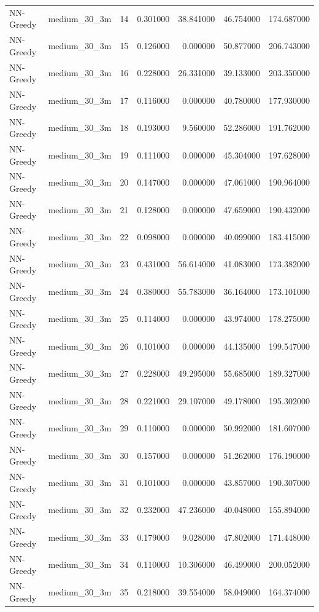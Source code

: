 \begin{tabular}{llrrrrr}
NN-Greedy & medium_30_3m & 14 & 0.301000 & 38.841000 & 46.754000 & 174.687000 \\
NN-Greedy & medium_30_3m & 15 & 0.126000 & 0.000000 & 50.877000 & 206.743000 \\
NN-Greedy & medium_30_3m & 16 & 0.228000 & 26.331000 & 39.133000 & 203.350000 \\
NN-Greedy & medium_30_3m & 17 & 0.116000 & 0.000000 & 40.780000 & 177.930000 \\
NN-Greedy & medium_30_3m & 18 & 0.193000 & 9.560000 & 52.286000 & 191.762000 \\
NN-Greedy & medium_30_3m & 19 & 0.111000 & 0.000000 & 45.304000 & 197.628000 \\
NN-Greedy & medium_30_3m & 20 & 0.147000 & 0.000000 & 47.061000 & 190.964000 \\
NN-Greedy & medium_30_3m & 21 & 0.128000 & 0.000000 & 47.659000 & 190.432000 \\
NN-Greedy & medium_30_3m & 22 & 0.098000 & 0.000000 & 40.099000 & 183.415000 \\
NN-Greedy & medium_30_3m & 23 & 0.431000 & 56.614000 & 41.083000 & 173.382000 \\
NN-Greedy & medium_30_3m & 24 & 0.380000 & 55.783000 & 36.164000 & 173.101000 \\
NN-Greedy & medium_30_3m & 25 & 0.114000 & 0.000000 & 43.974000 & 178.275000 \\
NN-Greedy & medium_30_3m & 26 & 0.101000 & 0.000000 & 44.135000 & 199.547000 \\
NN-Greedy & medium_30_3m & 27 & 0.228000 & 49.295000 & 55.685000 & 189.327000 \\
NN-Greedy & medium_30_3m & 28 & 0.221000 & 29.107000 & 49.178000 & 195.302000 \\
NN-Greedy & medium_30_3m & 29 & 0.110000 & 0.000000 & 50.992000 & 181.607000 \\
NN-Greedy & medium_30_3m & 30 & 0.157000 & 0.000000 & 51.262000 & 176.190000 \\
NN-Greedy & medium_30_3m & 31 & 0.101000 & 0.000000 & 43.857000 & 190.307000 \\
NN-Greedy & medium_30_3m & 32 & 0.232000 & 47.236000 & 40.048000 & 155.894000 \\
NN-Greedy & medium_30_3m & 33 & 0.179000 & 9.028000 & 47.802000 & 171.448000 \\
NN-Greedy & medium_30_3m & 34 & 0.110000 & 10.306000 & 46.499000 & 200.052000 \\
NN-Greedy & medium_30_3m & 35 & 0.218000 & 39.554000 & 58.049000 & 164.374000 \\

\end{tabular}
